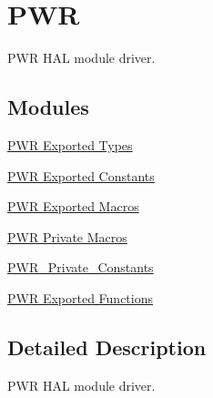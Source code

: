 \hypertarget{group___p_w_r}{\section{P\-W\-R}
\label{group___p_w_r}
}


P\-W\-R H\-A\-L module driver.  


\subsection*{Modules}
\begin{DoxyCompactItemize}
\item 
\hyperlink{group___p_w_r___exported___types}{P\-W\-R Exported Types}
\item 
\hyperlink{group___p_w_r___exported___constants}{P\-W\-R Exported Constants}
\item 
\hyperlink{group___p_w_r___exported___macros}{P\-W\-R Exported Macros}
\item 
\hyperlink{group___p_w_r___private___macros}{P\-W\-R Private Macros}
\item 
\hyperlink{group___p_w_r___private___constants}{P\-W\-R\-\_\-\-Private\-\_\-\-Constants}
\item 
\hyperlink{group___p_w_r___exported___functions}{P\-W\-R Exported Functions}
\end{DoxyCompactItemize}


\subsection{Detailed Description}
P\-W\-R H\-A\-L module driver. 